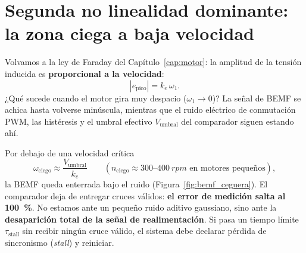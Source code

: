 \documentclass[11pt,a4paper,oneside]{book}
\begin{document}
\section{Segunda no linealidad dominante: la zona ciega a baja velocidad}

Volvamos a la ley de Faraday del Capítulo~\ref{cap:motor}: la amplitud de la
tensión inducida es \textbf{proporcional a la velocidad}:
\[
  |e_{\text{pico}}| = k_e\,\omega_1.
\]
¿Qué sucede cuando el motor gira muy despacio ($\omega_1 \to 0$)? La señal de
BEMF se achica hasta volverse minúscula, mientras que el ruido eléctrico de
conmutación PWM, las histéresis y el umbral efectivo $V_{\text{umbral}}$ del
comparador siguen estando ahí.

Por debajo de una velocidad crítica
\begin{equation}
  \omega_{\text{ciego}} \approx \frac{V_{\text{umbral}}}{k_e}
  \qquad (n_{\text{ciego}} \approx 300\text{--}\SI{400}{rpm}\text{ en motores pequeños}),
  \label{eq:zona_ciega}
\end{equation}
la BEMF queda enterrada bajo el ruido (Figura~\ref{fig:bemf_ceguera}). El
comparador deja de entregar cruces válidos: \textbf{el error de medición salta
al \SI{100}{\percent}}. No estamos ante un pequeño ruido aditivo gaussiano, sino
ante la \textbf{desaparición total de la señal de realimentación}. Si pasa un
tiempo límite $\tau_{\text{stall}}$ sin recibir ningún cruce válido, el sistema
debe declarar pérdida de sincronismo (\emph{stall}) y reiniciar.
\end{document}

